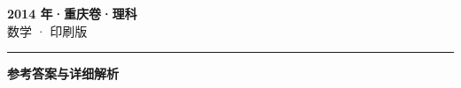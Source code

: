 \documentclass[zihao=5, a4paper]{ctexart}
\begin{document}
\begin{center}
  {\Large\bfseries 2014 年·重庆卷·理科}\\[4pt]
  {\large 数学 · 印刷版}
\end{center}
\medskip
{}

\par\bigskip\hrule\bigskip
{}
\Needspace{0.55\textheight}
\begin{center}{\large\bfseries 参考答案与详细解析}\end{center}
\smallskip

\end{document}
